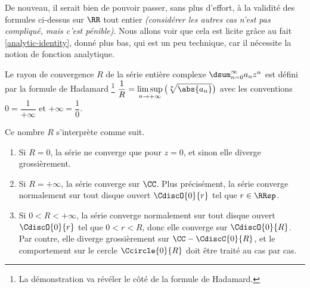 De nouveau, il serait bien de pouvoir passer, sans plus d'effort, à la validité des formules ci-dessus sur $\RR$ tout entier \emph{(considérer les autres cas n'est pas compliqué, mais c'est pénible)}.
%
Nous allons voir que cela est licite grâce au fait \ref{analytic-identity}, donné plus bas, qui est un peu technique, car il nécessite la notion de fonction analytique.




\begin{preli} \label{conv-ray}
    Le rayon de convergence $R$ de la série entière complexe $\dsum_{n=0}^{\infty} a_n z^n$ est défini par la formule de Hadamard%
    \footnote{
    	La démonstration va révéler le côté  de la formule de Hadamard.
    }
    $\displaystyle \frac{1}{R} = \limsup_{n \to +\infty} \big( \sqrt[n]{\abs{a_n}} \big)$
    avec les conventions
    $0 = \dfrac{1}{+\infty}$
    et
    $+\infty = \dfrac{1}{0}$.

    \smallskip
    
    Ce nombre $R$ s'interprète comme suit.
    \begin{enumerate}
        \item Si $R = 0$, la série ne converge que pour $z = 0$, et sinon elle diverge grossièrement.

        \item Si $R = +\infty$, la série converge sur $\CC$.
        Plus précisément, la série converge normalement sur tout disque ouvert $\CdiscO{0}{r}$ tel que $r \in \RRsp$. 

        \item Si $0 < R < +\infty$, la série converge normalement sur tout disque ouvert $\CdiscO{0}{r}$ tel que $0 < r < R$, donc elle converge sur $\CdiscO{0}{R}$.
        Par contre, elle diverge grossièrement sur $\CC - \CdiscC{0}{R}$,
        et
        le comportement sur le cercle $\Ccircle{0}{R}$ doit être traité au cas par cas.
    \end{enumerate}
\end{preli}


